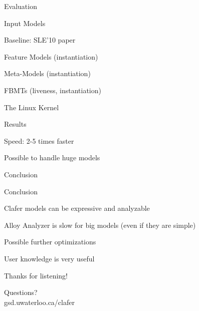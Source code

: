 \documentclass[table,15pt,t]{beamer}
\newcommand{\vmiddle}[1]{
  \vspace{\stretch{1}}
  #1
  \vspace{\stretch{1}}
}
\newcommand{\interframe}[1]{
\begin{frame}{}
\vmiddle{\hmiddle{\Huge #1}}
\end{frame}
}
\newcommand{\mlist}[1]{
\vmiddle{
  \begin{list}{}{}
    #1
  \end{list}
  }
}
\newcommand{\hmiddle}[1]{
  \begin{center}#1\end{center}
}
\newcounter{i}
\begin{document}
\interframe{Evaluation}

\begin{frame}{Input Models}
 \mlist{
    \item Baseline: SLE'10 paper\pause
    \item Feature Models (instantiation)
    \item Meta-Models (instantiation)
    \item FBMTs (liveness, instantiation)\pause
    \item The Linux Kernel
 }
\end{frame}

\begin{frame}{Results}
 \mlist{
    \item Speed: 2-5 times faster
    \item Possible to handle huge models
 }
\end{frame}

\interframe{Conclusion}

\begin{frame}{Conclusion}
 \mlist{
    \item Clafer models can be expressive and analyzable
    \item Alloy Analyzer is slow for big models (even if they are simple)
    \item Possible further optimizations
    \item User knowledge is very useful
 }
\end{frame}

\interframe{Thanks for listening!}

\interframe{Questions?\\[1cm]\normalsize{\textsf{gsd.uwaterloo.ca/clafer}}}
\end{document}
